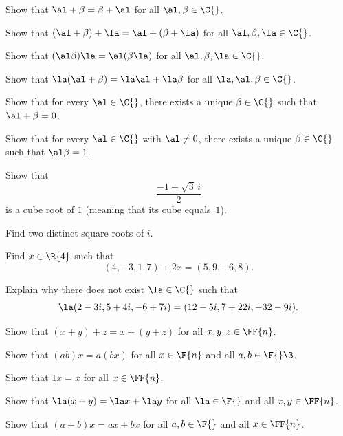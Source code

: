 
\exercise
Show that $\al + \beta = \beta + \al$ for all $\al, \beta \in \C{}$.


\exercise
Show that $(\al + \beta) +  \la = \al + (\beta + \la)$ for all $\al, \beta, \la \in \C{}$.


\exercise
Show that $(\al \beta)\la = \al(\beta \la)$ for all $\al, \beta, \la \in \C{}$.


\exercise
Show that $\la(\al + \beta) = \la \al + \la \beta$ for all $\la, \al, \beta \in
\C{}$.


\exercise
Show that for every $\al \in \C{}$, there exists a unique $\beta \in \C{}$ such that
$\al + \beta = 0$.


\exercise
Show that for every $\al \in \C{}$ with $\al \ne 0$, there exists a unique $\beta \in \C{}$ such that $\al \beta = 1$.


\exercise
Show that
\[
\frac{-1 + \sqrt{3} \, i}{2}
\]
is a cube root of $1$ (meaning that its cube  equals~$1$).


\exercise
Find two distinct square roots of $i$.


\exercise
Find $x \in \R{4}$ such that
\[
(4, -3, 1, 7) + 2x = (5, 9, -6, 8).
\]
\exercisedisplayend


\exercise
Explain why there does not exist $\la \in \C{}$ such that
\[
\la (2 - 3i, 5 + 4i, -6 + 7i) = (12 - 5i, 7 + 22i, -32 - 9i).
\]
\exercisedisplayend


\exercise
Show that $(x + y) + z  = x + (y + z) $ for all $x, y, z \in \FF{n}$.


\exercise
Show that $(ab)x = a(bx)$ for all $x \in \F{n}$ and all $a, b \in \F{}\3$.


\exercise
Show that $1x = x$ for all $x \in \FF{n}$.


\exercise
Show that $\la(x + y) = \la x + \la y$ for all $\la \in \F{}$ and all $x, y \in \FF{n}$.


\exercise
Show that $(a + b)x = ax + bx$ for all $a, b \in \F{}$ and all $x \in \FF{n}$.


